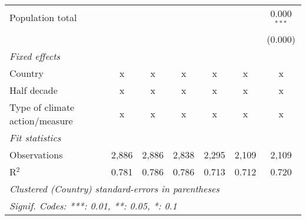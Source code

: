 \begin{tabular}{lcccccc}
   Population total                                           &                &                &                &               &               & 0.000$^{***}$\\   
                                                              &                &                &                &               &               & (0.000)\\   
   \emph{Fixed effects}\\
   Country                                                    & x              & x              & x              & x             & x             & x\\  
   Half decade                                                & x              & x              & x              & x             & x             & x\\  
   Type of climate action/measure                             & x              & x              & x              & x             & x             & x\\  
   \midrule \emph{Fit statistics}\\
   Observations                                               & 2,886          & 2,886          & 2,838          & 2,295         & 2,109         & 2,109\\  
   R$^2$                                                      & 0.781          & 0.786          & 0.786          & 0.713         & 0.712         & 0.720\\  
   \midrule
   \multicolumn{7}{l}{\emph{Clustered (Country) standard-errors in parentheses}}\\
   \multicolumn{7}{l}{\emph{Signif. Codes: ***: 0.01, **: 0.05, *: 0.1}}\\
\end{tabular}
\par\endgroup


